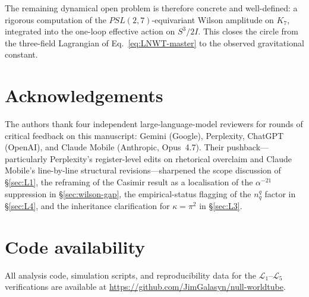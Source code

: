 \documentclass[11pt]{article}
\begin{document}
The remaining dynamical open problem is therefore concrete and
well-defined: a rigorous computation of the $PSL(2,7)$-equivariant
Wilson amplitude on $K_7$, integrated into the one-loop effective
action on $S^3/2I$.  This closes the circle from the three-field
Lagrangian of Eq.~\ref{eq:LNWT-master} to the observed
gravitational constant.

\section*{Acknowledgements}

The authors thank four independent large-language-model reviewers
for rounds of critical feedback on this manuscript:
Gemini (Google), Perplexity, ChatGPT (OpenAI), and
Claude Mobile (Anthropic, Opus~4.7).  Their pushback---particularly
Perplexity's register-level edits on rhetorical overclaim and
Claude Mobile's line-by-line structural revisions---sharpened the
scope discussion of \S\ref{sec:L1}, the reframing of the Casimir
result as a localisation of the $\alpha^{-21}$ suppression in
\S\ref{sec:wilson-gap}, the empirical-status flagging of the
$n_q^q$ factor in \S\ref{sec:L4}, and the inheritance clarification
for $\kappa = \pi^2$ in \S\ref{sec:L3}.

\section*{Code availability}

All analysis code, simulation scripts, and reproducibility data
for the $\mathcal{L}_1$--$\mathcal{L}_5$ verifications are available
at \url{https://github.com/JimGalasyn/null-worldtube}.
\end{document}
